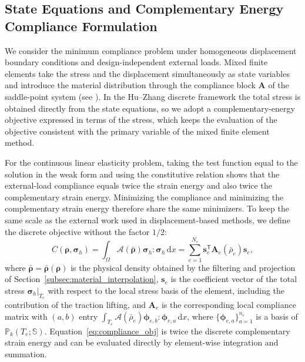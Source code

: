 \subsection{State Equations and Complementary Energy Compliance Formulation}
\label{subsec:compliance_formulation}

We consider the minimum compliance problem under homogeneous displacement boundary conditions and design-independent external loads. Mixed finite elements take the stress and the displacement simultaneously as state variables and introduce the material distribution through the compliance block $\boldsymbol{A}$ of the saddle-point system (see \cite{BruggiVenini2007}). In the Hu--Zhang discrete framework the total stress is obtained directly from the state equations, so we adopt a complementary-energy objective expressed in terms of the stress, which keeps the evaluation of the objective consistent with the primary variable of the mixed finite element method.

For the continuous linear elasticity problem, taking the test function equal to the solution in the weak form and using the constitutive relation shows that the external-load compliance equals twice the strain energy and also twice the complementary strain energy. Minimizing the compliance and minimizing the complementary strain energy therefore share the same minimizers. To keep the same scale as the external work used in displacement-based methods, we define the discrete objective without the factor $1/2$:
\begin{equation}
\label{eq:compliance_obj}
C(\boldsymbol{\rho}, \boldsymbol{\sigma}_h)
= \int_\Omega \mathcal{A}(\bar{\boldsymbol{\rho}}) \boldsymbol{\sigma}_h : \boldsymbol{\sigma}_h \,\mathrm{d}x
= \sum_{e=1}^{N_e} \boldsymbol{s}_e^{\mathsf T} \boldsymbol{A}_e(\bar{\rho}_e) \boldsymbol{s}_e,
\end{equation}
where $\bar{\boldsymbol{\rho}} = \bar{\boldsymbol{\rho}}(\boldsymbol{\rho})$ is the physical density obtained by the filtering and projection of Section~\ref{subsec:material_interpolation}, $\boldsymbol{s}_e$ is the coefficient vector of the total stress $\boldsymbol{\sigma}_h|_{T_e}$ with respect to the local stress basis of the element, including the contribution of the traction lifting, and $\boldsymbol{A}_e$ is the corresponding local compliance matrix with $(a,b)$ entry $\int_{T_e} \mathcal{A}(\bar{\rho}_e) \boldsymbol{\phi}_{e,b} : \boldsymbol{\phi}_{e,a} \,\mathrm{d}x$, where $\{\boldsymbol{\phi}_{e,a}\}_{a=1}^{n_e}$ is a basis of $\mathbb{P}_k(T_e;\mathbb{S})$. Equation~\eqref{eq:compliance_obj} is twice the discrete complementary strain energy and can be evaluated directly by element-wise integration and summation.

